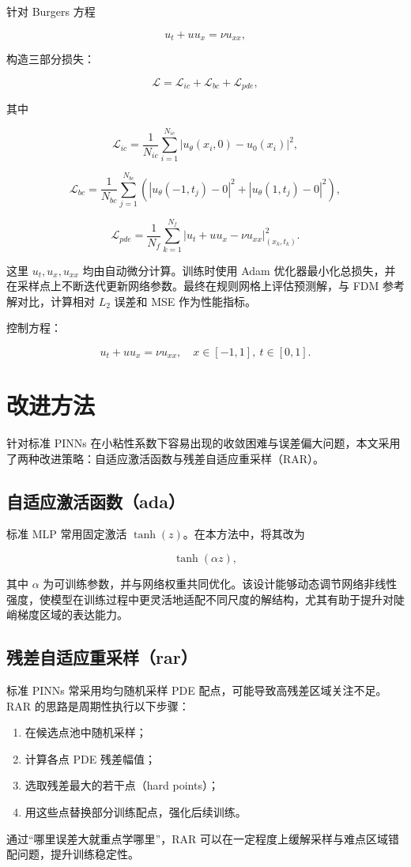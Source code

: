 \documentclass[12pt,a4paper]{ctexart}
\begin{document}
针对 Burgers 方程\par
\[
u_t + u u_x = \nu u_{xx},
\]\par
构造三部分损失：\par
\[
\mathcal{L}=\mathcal{L}_{ic}+\mathcal{L}_{bc}+\mathcal{L}_{pde},
\]\par
其中\par
\[
\mathcal{L}_{ic}=\frac{1}{N_{ic}}\sum_{i=1}^{N_{ic}}\left|u_\theta(x_i,0)-u_0(x_i)\right|^2,
\]\par
\[
\mathcal{L}_{bc}=\frac{1}{N_{bc}}\sum_{j=1}^{N_{bc}}\left(\left|u_\theta(-1,t_j)-0\right|^2+\left|u_\theta(1,t_j)-0\right|^2\right),
\]\par
\[
\mathcal{L}_{pde}=\frac{1}{N_f}\sum_{k=1}^{N_f}\left|u_t+u u_x-\nu u_{xx}\right|_{(x_k,t_k)}^2.
\]\par
这里 $u_t,u_x,u_{xx}$ 均由自动微分计算。训练时使用 Adam 优化器最小化总损失，并在采样点上不断迭代更新网络参数。最终在规则网格上评估预测解，与 FDM 参考解对比，计算相对 $L_2$ 误差和 MSE 作为性能指标。\par

控制方程：\par
\[
u_t + u u_x = \nu u_{xx}, \quad x\in[-1,1],\ t\in[0,1].
\]\par

\section{改进方法}
针对标准 PINNs 在小粘性系数下容易出现的收敛困难与误差偏大问题，本文采用了两种改进策略：自适应激活函数与残差自适应重采样（RAR）。\par

\subsection{自适应激活函数（ada）}
标准 MLP 常用固定激活 $\tanh(z)$。在本方法中，将其改为\par
\[
\tanh(\alpha z),
\]\par
其中 $\alpha$ 为可训练参数，并与网络权重共同优化。该设计能够动态调节网络非线性强度，使模型在训练过程中更灵活地适配不同尺度的解结构，尤其有助于提升对陡峭梯度区域的表达能力。

\subsection{残差自适应重采样（rar）}
标准 PINNs 常采用均匀随机采样 PDE 配点，可能导致高残差区域关注不足。RAR 的思路是周期性执行以下步骤：
\begin{enumerate}
  \item 在候选点池中随机采样；
  \item 计算各点 PDE 残差幅值；
  \item 选取残差最大的若干点（hard points）；
  \item 用这些点替换部分训练配点，强化后续训练。
\end{enumerate}\par
通过“哪里误差大就重点学哪里”，RAR 可以在一定程度上缓解采样与难点区域错配问题，提升训练稳定性。\par
\end{document}

